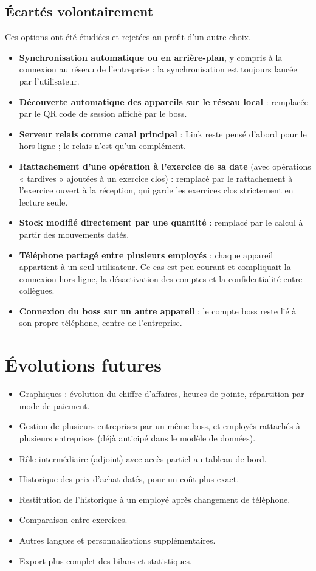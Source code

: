 \documentclass[11pt,a4paper]{article}
\begin{document}
	\subsection{Écartés volontairement}
	Ces options ont été étudiées et rejetées au profit d'un autre choix.
	\begin{itemize}[leftmargin=*]
		\item \textbf{Synchronisation automatique ou en arrière-plan}, y compris à la connexion au réseau de l'entreprise : la synchronisation est toujours lancée par l'utilisateur.
		\item \textbf{Découverte automatique des appareils sur le réseau local} : remplacée par le QR code de session affiché par le boss.
		\item \textbf{Serveur relais comme canal principal} : Link reste pensé d'abord pour le hors ligne ; le relais n'est qu'un complément.
		\item \textbf{Rattachement d'une opération à l'exercice de sa date} (avec opérations « tardives » ajoutées à un exercice clos) : remplacé par le rattachement à l'exercice ouvert à la réception, qui garde les exercices clos strictement en lecture seule.
		\item \textbf{Stock modifié directement par une quantité} : remplacé par le calcul à partir des mouvements datés.
		\item \textbf{Téléphone partagé entre plusieurs employés} : chaque appareil appartient à un seul utilisateur. Ce cas est peu courant et compliquait la connexion hors ligne, la désactivation des comptes et la confidentialité entre collègues.
		\item \textbf{Connexion du boss sur un autre appareil} : le compte boss reste lié à son propre téléphone, centre de l'entreprise.
	\end{itemize}

	\section{Évolutions futures}
	\begin{itemize}[leftmargin=*]
		\item Graphiques : évolution du chiffre d'affaires, heures de pointe, répartition par mode de paiement.
		\item Gestion de plusieurs entreprises par un même boss, et employés rattachés à plusieurs entreprises (déjà anticipé dans le modèle de données).
		\item Rôle intermédiaire (adjoint) avec accès partiel au tableau de bord.
		\item Historique des prix d'achat datés, pour un coût plus exact.
		\item Restitution de l'historique à un employé après changement de téléphone.
		\item Comparaison entre exercices.
		\item Autres langues et personnalisations supplémentaires.
		\item Export plus complet des bilans et statistiques.
	\end{itemize}
\end{document}
